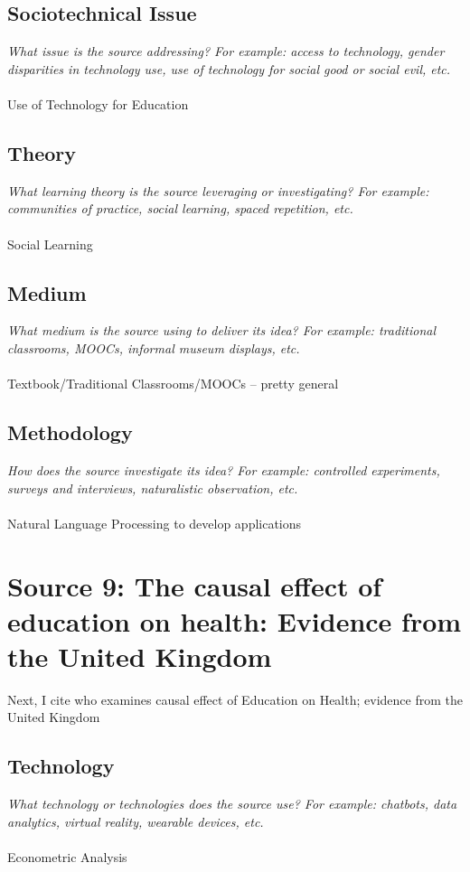 \documentclass[12pt, final]{article}
\begin{document}
\subsection{Sociotechnical Issue}
\textit{What issue is the source addressing? For example: access to technology, gender disparities in technology use, use of technology for social good or social evil, etc.}
\\
\\
Use of Technology for Education

\subsection{Theory}
\textit{What learning theory is the source leveraging or investigating? For example: communities of practice, social learning, spaced repetition, etc.}
\\
\\
Social Learning

\subsection{Medium}
\textit{What medium is the source using to deliver its idea? For example: traditional classrooms, MOOCs, informal museum displays, etc.}
\\
\\
Textbook/Traditional Classrooms/MOOCs -- pretty general

\subsection{Methodology}
\textit{How does the source investigate its idea? For example: controlled experiments, surveys and interviews, naturalistic observation, etc.}
\\
\\
Natural Language Processing to develop applications

\section{Source 9: The causal effect of education on health: Evidence from the United Kingdom}
\label{Source 9}

Next, I cite \cite{Siles} who examines causal effect of Education on Health; evidence from the United Kingdom

\subsection{Technology}
\textit{What technology or technologies does the source use? For example: chatbots, data analytics, virtual reality, wearable devices, etc.}
\\
\\
Econometric Analysis
\end{document}
